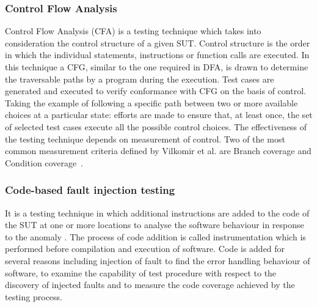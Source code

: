 \subsubsection{Control Flow Analysis}
Control Flow Analysis (CFA) is a testing technique which takes into consideration the control structure of a given SUT. Control structure is the order in which the individual statements, instructions or function calls are executed. In this technique a CFG, similar to the one required in DFA, is drawn to determine the traversable paths by a program during the execution. Test cases are generated and executed to verify conformance with CFG on the basis of control. Taking the example of following a specific path between two or more available choices at a particular state: efforts are made to ensure that, at least once, the set of selected test cases execute all the possible control choices. The effectiveness of the testing technique depends on measurement of control. Two of the most common measurement criteria defined by Vilkomir et al. are Branch coverage and Condition coverage~\cite{vilkomir2003tolerance}. 

\subsubsection{Code-based fault injection testing}
It is a testing technique in which additional instructions are added to the code of the SUT at one or more locations to analyse the software behaviour in response to the anomaly \cite{voas1997software}. The process of code addition is called instrumentation which is performed before compilation and execution of software. Code is added for several reasons including injection of fault to find the error handling behaviour of software, to examine the capability of test procedure with respect to the discovery of injected faults and to measure the code coverage achieved by the testing process.    

